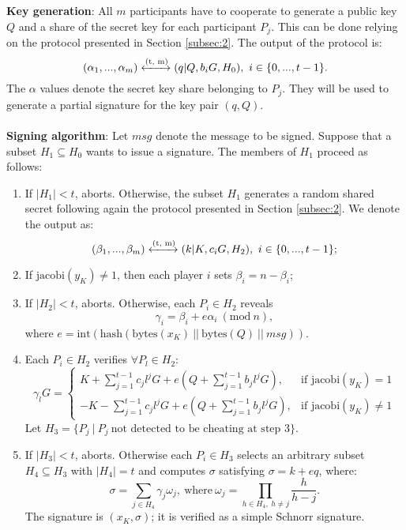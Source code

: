 \bigskip
\noindent
{\bf Key generation}: All $m$ participants have to cooperate to generate a public key $Q$ and a share of the secret key for each participant $P_j$. This can be done relying on the protocol presented in Section \ref{subsec:2}. The output of the protocol is:
$$(\alpha_1, ..., \alpha_m) \xleftrightarrow{\text{(t, m)}} (q|Q, b_iG, H_0), \ i \in \{0, ..., t - 1\}.$$
The $\alpha$ values denote the secret key share belonging to $P_j$. They will be used to generate a partial signature for the key pair $(q, Q)$.
\\
\\
{\bf Signing algorithm}: Let $msg$ denote the message to be signed. Suppose that a subset $H_1 \subseteq H_0$ wants to issue a signature. The members of $H_1$ proceed as follows:
\begin{enumerate}
	\item If $|H_1| < t$, aborts. Otherwise, the subset $H_1$ generates a random shared secret following again the protocol presented in Section \ref{subsec:2}. We denote the output as:
	$$(\beta_1, ..., \beta_m) \xleftrightarrow{\text{(t, m)}} (k|K, c_iG, H_2), \ i \in \{0, ..., t - 1\};$$
	\item If $\text{jacobi}(y_K) \neq 1$, then each player $i$ sets $\beta_i = n - \beta_i$;
	\item If $|H_2| < t$, aborts. Otherwise, each $P_i \in H_2$ reveals
	$$\gamma_i = \beta_i + e\alpha_i \ (\text{mod} \ n),$$
	where $e = \text{int}(\text{hash}(\text{bytes}(x_K) \ || \ \text{bytes}(Q) \ || \ msg))$.
	\item Each $P_i \in H_2$ verifies $\forall P_l \in H_2$:
	$$\gamma_lG = \begin{cases} K + \sum_{j = 1}^{t - 1} c_jl^jG + e\left(Q + \sum_{j = 1}^{t - 1}b_jl^jG\right), & \mbox{if } \text{jacobi}(y_K) = 1 \\ - K -\sum_{j = 1}^{t - 1} c_jl^jG + e\left(Q + \sum_{j = 1}^{t - 1}b_jl^jG\right), & \mbox{if } \text{jacobi}(y_K) \neq 1 \end{cases}$$
	Let $H_3 = \{P_j \ | \ P_j \ \text{not detected to be cheating at step 3}\}$.
	\item If $|H_3| < t$, aborts. Otherwise each $P_i \in H_3$ selects an arbitrary subset $H_4 \subseteq H_3$ with $|H_4| = t$ and computes $\sigma$ satisfying $\sigma = k + eq$, where:
	$$\sigma = \sum_{j \in H_4}\gamma_j\omega_j, \ \text{where} \ \omega_j = \prod_{h \in H_4, \ h \neq j}\frac{h}{h - j}.$$
	The signature is $(x_K, \sigma)$; it is verified as a simple Schnorr signature.
\end{enumerate}
